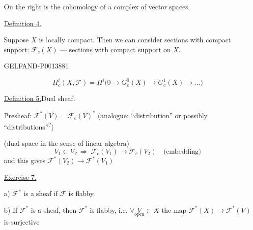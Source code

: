 On the right is the cohomology of a complex of vector spaces.

\uline{Definition 4.}

Suppose \(X\) is locally compact. Then we can consider sections with compact support:
\(\mathcal F_c(X)\) --- sections with compact support on \(X\).


\begin{GelfandAdjacentEvidence}{GELFAND-P001388}{1}

\[
H_c^i(X,\mathcal F)=H^i\bigl(0\longrightarrow G_c^0(X)\longrightarrow
G_c^1(X)\longrightarrow\ldots\bigr)
\]

\uline{Definition 5.}\quad Dual sheaf.

Presheaf: \(\mathcal F^*(V)=\mathcal F_c(V)^*\)
(analogue: “distribution” or possibly “distributions”\textsuperscript{?})
\end{GelfandAdjacentEvidence}


(dual space in the sense of linear algebra)
\[
V_1\subset V_2\ \Rightarrow\ \mathcal F_c(V_1)\longrightarrow\mathcal F_c(V_2)
\quad\text{(embedding)}
\]
and this gives \(\mathcal F^*(V_2)\longrightarrow\mathcal F^*(V_1)\)

\uline{Exercise 7.}

a) \(\mathcal F^*\) is a sheaf if \(\mathcal F\) is flabby.

b) If \(\mathcal F^*\) is a sheaf, then \(\mathcal F^*\)
is flabby, i.e. \(\forall\underset{\text{open}}{V}\subset X\)
the map \(\mathcal F^*(X)\longrightarrow\mathcal F^*(V)\) is surjective


